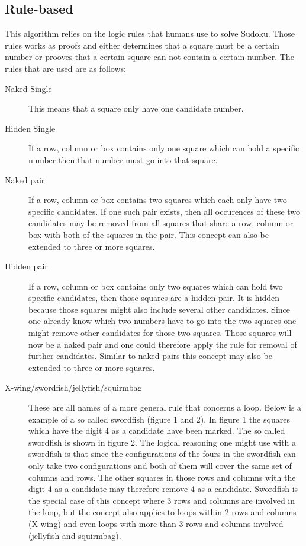 \documentclass[a4paper,11pt]{kth-mag}
\begin{document}
\subsection{Rule-based}
This algorithm relies on the logic rules that humans use to solve Sudoku.
Those rules works as proofs and either determines that a square must be a certain number or prooves that a certain square can not contain a certain number.
The rules that are used are as follows:
\begin{description}
    \item[Naked Single] 
    This means that a square only have one candidate number.
    \item[Hidden Single] 
    If a row, column or box contains only one square which can hold a specific number then that number must go into that square.
    \item[Naked pair] 
    If a row, column or box contains two squares which each only have two specific candidates.
If one such pair exists, then all occurences of these two candidates may be removed from all squares that share a row, column or box with both of the squares in the pair.
This concept can also be extended to three or more squares.
    \item[Hidden pair]
    If a row, column or box contains only two squares which can hold two specific candidates, then those squares are a hidden pair.
It is hidden because those squares might also include several other candidates.
Since one already know which two numbers have to go into the two squares one might remove other candidates for those two squares.
Those squares will now be a naked pair and one could therefore apply the rule for removal of further candidates.
Similar to naked pairs this concept may also be extended to three or more squares.

    \item[X-wing/swordfish/jellyfish/squirmbag]
    These are all names of a more general rule that concerns a loop.
Below is a example of a so called swordfish (figure 1 and 2).
In figure 1 the squares which have the digit 4 as a candidate have been marked.
The so called swordfish is shown in figure 2.
The logical reasoning one might use with a swordfish is that since the configurations of the fours in the swordfish can only take two configurations and both of them will cover the same set of columns and rows.
The other squares in those rows and columns with the digit 4 as a candidate may therefore remove 4 as a candidate.
Swordfish is the special case of this concept where 3 rows and columns are involved in the loop, but the concept also applies to loops within 2 rows and columns (X-wing) and even loops with more than 3 rows and columns involved (jellyfish and squirmbag).


\end{description}
\end{document}

